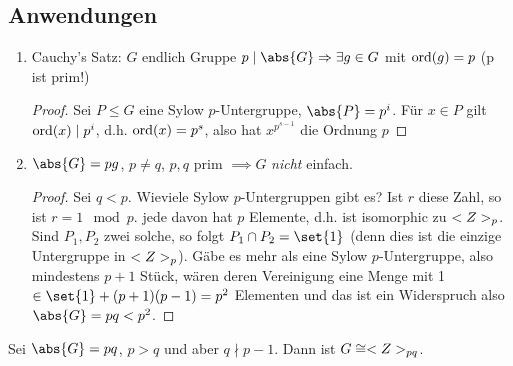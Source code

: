 \subsection*{Anwendungen}
\begin{enumerate}
	\item Cauchy's Satz: $G$ endlich Gruppe $p \mid \abs{G} \implies \exists g \in G$ mit $\operatorname{ord}(g) = p$ (p ist prim!)
	\begin{proof}
		Sei $P \le G$ eine Sylow $p$-Untergruppe, $\abs{P} = p^i$. Für $x \in P$ gilt $\operatorname{ord}(x) \mid p^{i}$, d.h. $\operatorname{ord}(x) = p^s$, also hat $x^{p^{s-1}}$ die Ordnung $p$
	\end{proof}
	\item $\abs{G} = pg$, $p\neq q$, $p,q$ prim $\implies G$ \emph{nicht} einfach.
	\begin{proof}
		Sei $q < p$. Wieviele Sylow $p$-Untergruppen gibt es? Ist $r$ diese Zahl, so ist $r=1 \mod p$. jede davon hat $p$ Elemente, d.h. ist isomorphic zu $<Z>_p$. Sind $P_1, P_2$ zwei solche, so folgt $P_1 \cap P_2 = \set{1}$ (denn dies ist die einzige Untergruppe in $<Z>_p$). Gäbe es mehr als eine Sylow $p$-Untergruppe, also mindestens $p+1$ Stück, wären deren Vereinigung eine Menge mit 1 $\in \set{1} + (p+1)(p-1) = p^2$ Elementen und das ist ein Widerspruch also $\abs{G} = pq < p^2$.
	\end{proof}
\end{enumerate}
\begin{proposition}
	Sei $\abs{G} = pq$, $p>q$ und aber $q \nmid p-1$. Dann ist $G \cong <Z>_{pq}$.
\end{proposition}
